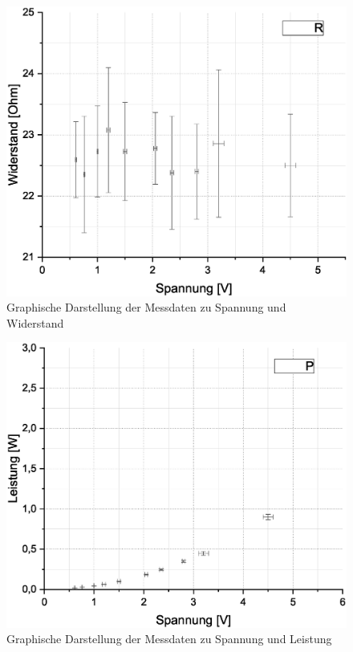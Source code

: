 \documentclass[10pt,a4paper]{article}
\begin{document}
\begin{figure}[H]
\centering
\includegraphics[scale=0.5]{Graph2}
\caption[Graph: Spannung \& Strom]{Graphische Darstellung der Messdaten zu Spannung und Widerstand}
\label{fig:SpannWid}
\end{figure}

\begin{figure}[H]
\centering
\includegraphics[scale=0.5]{Graph3}
\caption[Graph: Spannung \& Strom]{Graphische Darstellung der Messdaten zu Spannung und Leistung}
\label{fig:SpannPow}
\end{figure}
\end{document}
